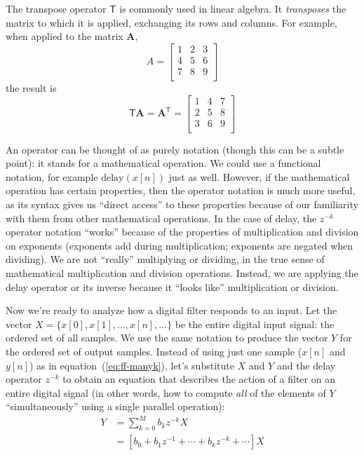 The transpose operator $\mathsf{T}$ is commonly used in linear
algebra.  It \emph{transposes} the matrix to which it is applied,
exchanging its rows and columns. For example, when applied to the
matrix $\mathbf{A}$,
\begin{equation*}
A=\left[
\begin{array}{ccc}
1 & 2 & 3 \\
4 & 5 & 6 \\
7 & 8 & 9 \\
\end{array}
\right]
\end{equation*}
the result is
\begin{equation*}
\mathsf{T}\mathbf{A} = \mathbf{A}^\mathsf{T} = \left[
\begin{array}{ccc}
1 & 4 & 7 \\
2 & 5 & 8 \\
3 & 6 & 9 \\
\end{array}
\right]
\end{equation*}

An operator can be thought of as purely notation (though this can be a
subtle point): it stands for a mathematical operation. We could use a
functional notation, for example $\mathrm{delay}(x[n])$ just as
well. However, if the mathematical operation has certain properties,
then the operator notation is much more useful, as its syntax gives us
``direct access'' to these properties because of our familiarity with
them from other mathematical operations. In the case of delay, the
$z^{-k}$ operator notation ``works'' because of the properties of
multiplication and division on exponents (exponents
add during multiplication; exponents are negated when dividing). We
are not ``really'' multiplying or dividing, in the true sense of
mathematical multiplication and division operations. 
Instead, we are applying the delay operator or its inverse because it ``looks like''
multiplication or division.

\begin{sloppypar}
  Now we're ready to analyze how a digital filter responds to an
  input.  Let the vector $X=\{x[0], x[1], \ldots, x[n], \ldots\}$ be
  the entire digital input signal: the ordered set of all samples.  We
  use the same notation to produce the vector $Y$ for the ordered set
  of output samples. Instead of using just one sample ($x[n]$ and
  $y[n]$) as in equation~(\ref{eq:ff-manyk}), let's substitute $X$ and
  $Y$ and the delay operator $z^{-k}$ to obtain an equation that
  describes the action of a filter on an entire digital signal (in
  other words, how to compute \emph{all} of the elements of $Y$
  ``simultaneously'' using a single parallel operation):
\begin{align}
Y &=\sum_{k=0}^M b_k z^{-k} X\\
  &= [b_0 + b_1z^{-1} + \cdots + b_k z^{-k} + \cdots]X
\end{align}
\end{sloppypar}

